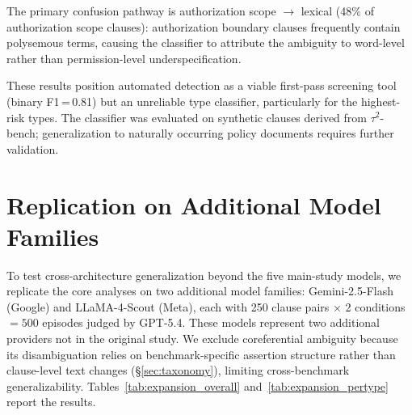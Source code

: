 The primary confusion pathway is authorization scope $\to$ lexical (48\% of authorization scope clauses): authorization boundary clauses frequently contain polysemous terms, causing the classifier to attribute the ambiguity to word-level rather than permission-level underspecification.

These results position automated detection as a viable first-pass screening tool (binary F1\,=\,0.81) but an unreliable type classifier, particularly for the highest-risk types. The classifier was evaluated on synthetic clauses derived from $\tau^2$-bench; generalization to naturally occurring policy documents requires further validation.

\section{Replication on Additional Model Families}
\label{app:model_expansion}

To test cross-architecture generalization beyond the five main-study models, we replicate the core analyses on two additional model families: Gemini-2.5-Flash (Google) and LLaMA-4-Scout (Meta), each with 250 clause pairs $\times$ 2 conditions $= 500$ episodes judged by GPT-5.4. These models represent two additional providers not in the original study. We exclude coreferential ambiguity because its disambiguation relies on benchmark-specific assertion structure rather than clause-level text changes (\S\ref{sec:taxonomy}), limiting cross-benchmark generalizability. Tables~\ref{tab:expansion_overall} and~\ref{tab:expansion_pertype} report the results.

\begin{table}[!ht]
\centering
\small
\caption{Replication results on two additional model families. C2 rank $\rho$ is computed against the original five-model pooled type ranking.}
\label{tab:expansion_overall}
\end{table}

